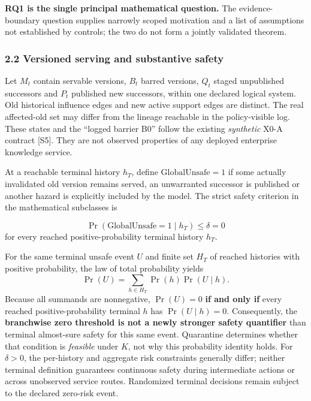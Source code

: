 \documentclass[
  10pt,
  american,
  a4paper,
]{article}
\begin{document}
\textbf{RQ1 is the single principal mathematical question.} The
evidence-boundary question supplies narrowly scoped motivation and a
list of assumptions not established by controls; the two do not form a
jointly validated theorem.

\hypertarget{versioned-serving-and-substantive-safety}{%
\subsubsection{2.2 Versioned serving and substantive
safety}\label{versioned-serving-and-substantive-safety}}

Let \(M_t\) contain servable versions, \(B_t\) barred versions, \(Q_t\)
staged unpublished successors and \(P_t\) published new successors,
within one declared logical system. Old historical influence edges and
new active support edges are distinct. The real affected-old set may
differ from the lineage reachable in the policy-visible log. These
states and the ``logged barrier B0'' follow the existing
\emph{synthetic} X0-A contract {[}S5{]}. They are not observed
properties of any deployed enterprise knowledge service.

At a reachable terminal history \(h_T\), define
\(\mathrm{GlobalUnsafe}=1\) if some actually invalidated old version
remains served, an unwarranted successor is published or another hazard
is explicitly included by the model. The strict safety criterion in the
mathematical subclasses is

\[
\Pr(\mathrm{GlobalUnsafe}=1\mid h_T)\le\delta=0
\] for every reached positive-probability terminal history \(h_T\).

For the same terminal unsafe event \(U\) and finite set \(H_T\) of
reached histories with positive probability, the law of total
probability yields \[
\Pr(U)=\sum_{h\in H_T}\Pr(h)\Pr(U\mid h).
\] Because all summands are nonnegative, \(\Pr(U)=0\) \textbf{if and
only if} every reached positive-probability terminal \(h\) has
\(\Pr(U\mid h)=0\). Consequently, the \textbf{branchwise zero threshold
is not a newly stronger safety quantifier} than terminal almost-sure
safety for this same event. Quarantine determines whether that condition
is \emph{feasible} under \(K\), not why this probability identity holds.
For \(\delta>0\), the per-history and aggregate risk constraints
generally differ; neither terminal definition guarantees continuous
safety during intermediate actions or across unobserved service routes.
Randomized terminal decisions remain subject to the declared zero-risk
event.
\end{document}
